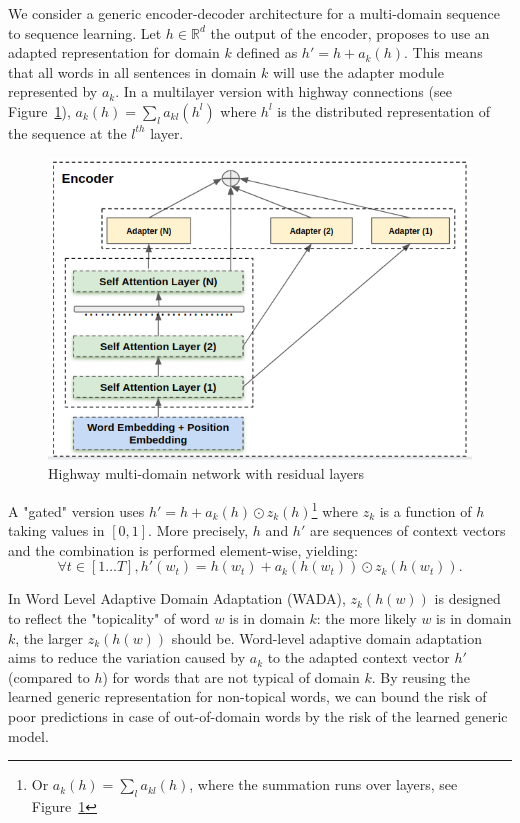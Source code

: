 \documentclass[11pt,a4paper]{article}
\newcommand{\R}{\ensuremath{\mathbb{R}}}
\begin{document}
We consider a generic encoder-decoder architecture for a multi-domain sequence to sequence learning. Let $h \in \R^d$ the output of the encoder, \cite{bapna19simple} proposes to use an adapted representation for domain $k$ defined as $h' = h + a_k(h)$. This means that all words in all sentences in domain $k$ will use the adapter module represented by $a_k$. In a multilayer version with highway connections (see Figure~\ref{fig:hrl-architecture}), $a_k(h) = \sum_{l} a_{kl}(h^l)$ where $h^l$ is the distributed representation of the sequence at the $l^{th}$ layer.
\begin{figure}[htbp]
  \centering
  \includegraphics[scale=0.3]{fig/highway_residual}
  \caption{Highway multi-domain network with residual layers}
\label{fig:hrl-architecture}
\end{figure}

A "gated" version uses $h' = h + a_k(h) \odot{} z_k(h)$\footnote{Or $a_k(h) = \sum_{l} a_{kl}(h)$, where the summation runs over layers, see Figure~\ref{fig:hrl-architecture}} where $z_k$ is a function of $h$ taking values in $[0,1]$. More precisely, $h$ and $h'$ are sequences of context vectors and the combination is performed element-wise, yielding:
\begin{equation}
   \forall t \in [1 \dots{} T], h'(w_t) = h(w_t) + a_k(h(w_t)) \odot{} z_k(h(w_t)). \label{eq:gated-residual}
\end{equation}

In Word Level Adaptive Domain Adaptation (WADA), $z_k(h(w))$ is designed to reflect the "topicality" of  word $w$ is in domain $k$: the more likely $w$ is in domain $k$, the larger $z_k(h(w))$ should be. Word-level adaptive domain adaptation aims to reduce the variation caused by $a_k$ to the adapted context vector $h'$ (compared to $h$) for words that are not typical of domain $k$. By reusing the learned generic representation for non-topical words, we can bound the risk of poor predictions in case of out-of-domain words by the risk of the learned generic model.
\end{document}
